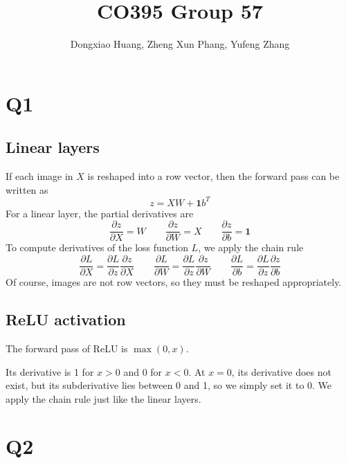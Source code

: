 \documentclass[12pt, a4paper]{article}
\title{\vspace{-6ex} CO395 Group 57 \vspace{-1ex}}
\author{Dongxiao Huang, Zheng Xun Phang, Yufeng Zhang}
\date{\vspace{-3ex}}
\begin{document}
\maketitle
\newcommand\ones{\bm{1}}

\section*{Q1}

\subsection*{Linear layers}
If each image in $X$ is reshaped into a row vector, then the forward pass can be written as
\[ z = XW + \ones b^T \]
For a linear layer, the partial derivatives are
\[ \frac{\partial z}{\partial X} = W \qquad \frac{\partial z}{\partial W} = X \qquad \frac{\partial z}{\partial b} = \ones \]
To compute derivatives of the loss function $L$, we apply the chain rule
\[ \frac{\partial L}{\partial X} = \frac{\partial L}{\partial z} \frac{\partial z}{\partial X} \qquad \frac{\partial L}{\partial W} = \frac{\partial L}{\partial z} \frac{\partial z}{\partial W} \qquad \frac{\partial L}{\partial b} = \frac{\partial L}{\partial z} \frac{\partial z}{\partial b} \]
Of course, images are not row vectors, so they must be reshaped appropriately.

\subsection*{ReLU activation}
The forward pass of ReLU is $\max(0, x)$.\par
\bigskip
Its derivative is 1 for $x > 0$ and 0 for $x < 0$. At $x = 0$, its derivative does not exist, but its subderivative  lies between 0 and 1, so we simply set it to 0. We apply the chain rule just like the linear layers.

\section*{Q2}
\end{document}
